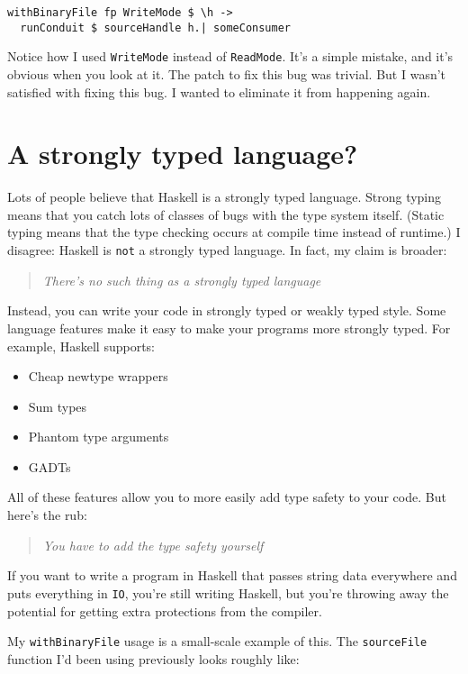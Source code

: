\begin{verbatim}
withBinaryFile fp WriteMode $ \h ->
  runConduit $ sourceHandle h.| someConsumer
\end{verbatim}
Notice how I used \texttt{WriteMode} instead of \texttt{ReadMode}. It's a simple mistake, and it's obvious when you look at it. The patch to fix this bug was trivial. But I wasn't satisfied with fixing this bug. I wanted to eliminate it from happening again.

\section{A strongly typed language?}

Lots of people believe that Haskell is a strongly typed language. Strong typing means that you catch lots of classes of bugs with the type system itself. (Static typing means that the type checking occurs at compile time instead of runtime.) I disagree: Haskell is \texttt{not} a strongly typed language. In fact, my claim is broader:

\begin{quotation}
\textit{There's no such thing as a strongly typed language}
\end{quotation}
Instead, you can write your code in strongly typed or weakly typed style. Some language features make it easy to make your programs more strongly typed. For example, Haskell supports:

\begin{itemize}
\item Cheap newtype wrappers
\item Sum types
\item Phantom type arguments
\item GADTs
\end{itemize}
All of these features allow you to more easily add type safety to your code. But here's the rub:

\begin{quotation}
 \textit{You have to add the type safety yourself }
\end{quotation}
If you want to write a program in Haskell that passes string data everywhere and puts everything in \texttt{IO}, you're still writing Haskell, but you're throwing away the potential for getting extra protections from the compiler.

My \texttt{withBinaryFile} usage is a small-scale example of this. The \texttt{sourceFile} function I'd been using previously looks roughly like:

